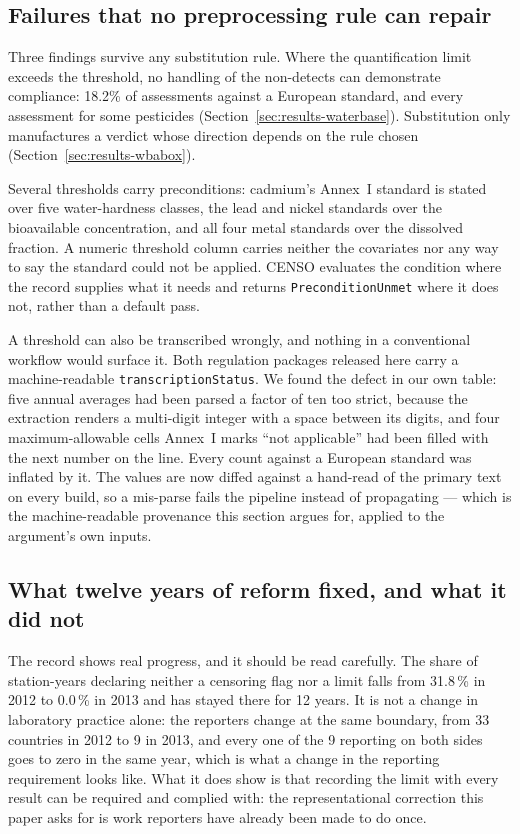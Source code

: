 \subsection{Failures that no preprocessing rule can repair}
Three findings survive any substitution rule. Where the quantification limit
exceeds the threshold, no handling of the non-detects can demonstrate
compliance: \num{18.2}\% of assessments against a European standard, and every
assessment for some pesticides (Section~\ref{sec:results-waterbase}).
Substitution only manufactures a verdict whose direction depends on the rule
chosen (Section~\ref{sec:results-wbabox}).

Several thresholds carry preconditions: cadmium's Annex~I standard is stated
over five water-hardness classes, the lead and nickel standards over the
bioavailable concentration, and all four metal standards over the dissolved
fraction. A numeric threshold column carries neither the covariates nor any way
to say the standard could not be applied. CENSO evaluates the condition where the
record supplies what it needs and returns \texttt{PreconditionUnmet} where it
does not, rather than a default pass.

A threshold can also be transcribed wrongly, and nothing in a conventional
workflow would surface it. Both regulation packages released here carry a
machine-readable \texttt{transcriptionStatus}. We found the defect in our own
table: five annual averages had been parsed a factor of ten too strict, because
the extraction renders a multi-digit integer with a space between its digits,
and four maximum-allowable cells Annex~I marks ``not applicable'' had been
filled with the next number on the line. Every count against a European
standard was inflated by it. The values are now diffed against a hand-read of
the primary text on every build, so a mis-parse
fails the pipeline instead of propagating --- which is the machine-readable
provenance this section argues for, applied to the argument's own inputs.

\subsection{What twelve years of reform fixed, and what it did not}
\label{sec:disc-reform}
The record shows real progress, and it should be read carefully. The share of
station-years declaring neither a censoring flag nor a limit falls from
\num{31.8}\,\% in \num{2012} to \num{0.0}\,\% in \num{2013} and has stayed there
for \num{12} years. It is not a change in laboratory practice alone: the
reporters change at the same boundary, from \num{33} countries in \num{2012} to
\num{9} in \num{2013}, and every one of the \num{9} reporting on both sides goes
to zero in the same year, which is what a change in the reporting requirement
looks like. What it does show is that
recording the limit with every result can be required and complied with: the
representational correction this paper asks for is work reporters have already
been made to do once.

